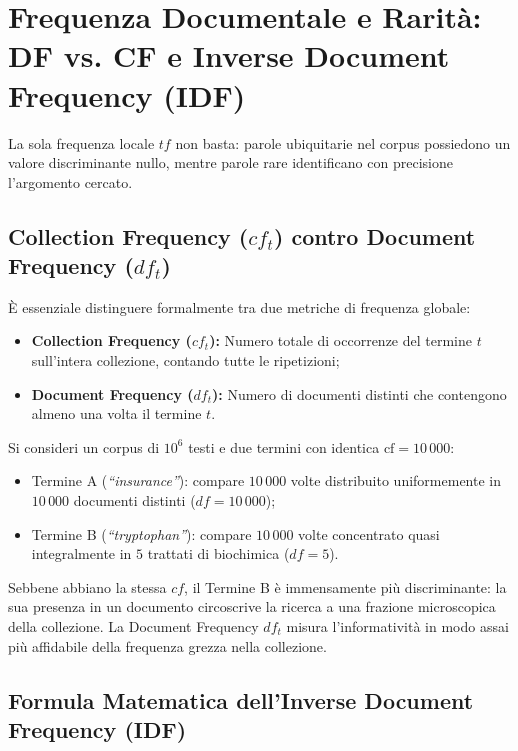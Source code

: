 \FloatBarrier
\section{Frequenza Documentale e Rarit\`a: DF vs. CF e Inverse Document Frequency (IDF)}
\label{sec:df-vs-cf-idf}

La sola frequenza locale $tf$ non basta: parole ubiquitarie nel corpus possiedono un valore discriminante nullo, mentre parole rare identificano con precisione l'argomento cercato.

\FloatBarrier
\subsection{Collection Frequency ($cf_t$) contro Document Frequency ($df_t$)}
\label{subsec:collection-vs-document-frequency}

È essenziale distinguere formalmente tra due metriche di frequenza globale:
\begin{itemize}
    \item \textbf{Collection Frequency ($cf_t$):} Numero totale di occorrenze del termine $t$ sull'intera collezione, contando tutte le ripetizioni;
    \item \textbf{Document Frequency ($df_t$):} Numero di documenti distinti che contengono almeno una volta il termine $t$.
\end{itemize}

\begin{example}
Si consideri un corpus di $10^6$ testi e due termini con identica $\text{cf} = 10\,000$:
\begin{itemize}
    \item Termine A (\textit{``insurance''}): compare $10\,000$ volte distribuito uniformemente in $10\,000$ documenti distinti ($df = 10\,000$);
    \item Termine B (\textit{``tryptophan''}): compare $10\,000$ volte concentrato quasi integralmente in $5$ trattati di biochimica ($df = 5$).
\end{itemize}
Sebbene abbiano la stessa $cf$, il Termine B \`e immensamente pi\`u discriminante: la sua presenza in un documento circoscrive la ricerca a una frazione microscopica della collezione. La Document Frequency $df_t$ misura l'informativit\`a in modo assai pi\`u affidabile della frequenza grezza nella collezione.
\end{example}

\FloatBarrier
\subsection{Formula Matematica dell'Inverse Document Frequency (IDF)}
\label{subsec:definizione-idf}

